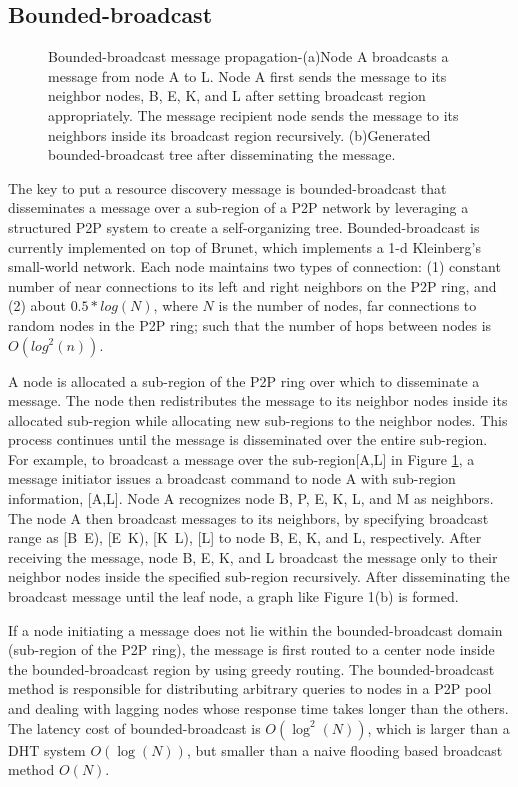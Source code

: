 \documentclass{acm_proc_article-sp}
\begin{document}
\subsection{Bounded-broadcast}
\begin{figure}[t]

\centering
{}
\caption{Bounded-broadcast message propagation-(a)Node A broadcasts a message from node A to L. Node A first sends the message to its neighbor nodes, B, E, K, and L after setting broadcast region appropriately.
The message recipient node sends the message to its neighbors inside its broadcast region recursively. (b)Generated bounded-broadcast tree after disseminating the message.
\label{figure:bb}
}
\end{figure}
The key to put a resource discovery message is bounded-broadcast\cite{deetoo} that disseminates a message over a sub-region of a P2P network by leveraging a structured P2P system to create a self-organizing tree. 
Bounded-broadcast is currently implemented on top of Brunet\cite{brunet}, which implements a 1-d Kleinberg's small-world network\cite{small_world_network}.
Each node maintains two types of connection: (1) constant number of near connections to its left and right neighbors on the P2P ring, and (2) about $0.5*log(N)$, where $N$ is the number of nodes, far connections to random nodes in the P2P ring; such that the number of hops between nodes is $O(log^2(n))$.

A node is allocated a sub-region of the P2P ring over which to disseminate a message. The node then redistributes the message to its neighbor nodes inside its allocated sub-region while allocating new sub-regions to the neighbor nodes. This process continues until the message is disseminated over the entire sub-region. 
For example, to broadcast a message over the sub-region[A,L] in Figure \ref{figure:bb}, a message initiator issues a broadcast command to node A with sub-region information, [A,L]. 
Node A recognizes node B, P, E, K, L, and M as neighbors.
The node A then broadcast messages to its neighbors, by specifying broadcast range as [B~E), [E~K), [K~L), [L] to node B, E, K, and L, respectively.
After receiving the message, node B, E, K, and L broadcast the message only to their neighbor nodes inside the specified sub-region recursively. 
After disseminating the broadcast message until the leaf node, a graph like Figure 1(b) is formed.

If a node initiating a message does not lie within the bounded-broadcast domain (sub-region of the P2P ring), the message is first routed to a center node inside the bounded-broadcast region by using greedy routing.
The bounded-broadcast method is responsible for distributing arbitrary queries to nodes in a P2P pool and dealing with lagging nodes whose response time takes longer than the others. 
The latency cost of bounded-broadcast is $O(\log^2(N))$\cite{deetoo}, which is larger than a DHT system $O(\log(N))$\cite{chord}, but smaller than a naive flooding based broadcast method $O(N)$.
\end{document}
